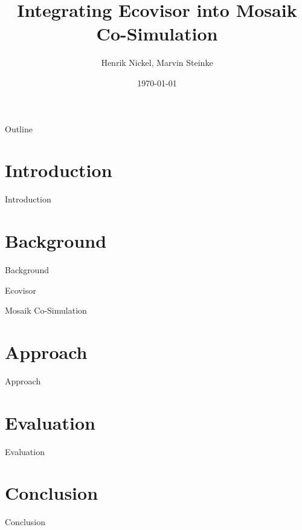 \documentclass[aspectratio=169, 10pt]{beamer}
\title[Ecovisor \& Mosaik Co-Simulation]{
    Integrating Ecovisor into Mosaik Co-Simulation
}
\author[Nickel \& Steinke]{Henrik Nickel, Marvin Steinke}
\institute{Technische Universität Berlin}
\date{\today}
\begin{document}
\frame[plain]{\titlepage}
\begin{frame}{Outline}
    \begin{center}
        \tableofcontents
    \end{center}
\end{frame}

\section{Introduction}
\begin{frame}{Introduction}
\end{frame}

\section{Background}
\begin{frame}{Background}
\end{frame}

\begin{frame}{Ecovisor}
\end{frame}

\begin{frame}{Mosaik Co-Simulation}
\end{frame}

\section{Approach}
\begin{frame}{Approach}
\end{frame}

\section{Evaluation}
\begin{frame}{Evaluation}
\end{frame}

\section{Conclusion}
\begin{frame}{Conclusion}
\end{frame}
\end{document}
